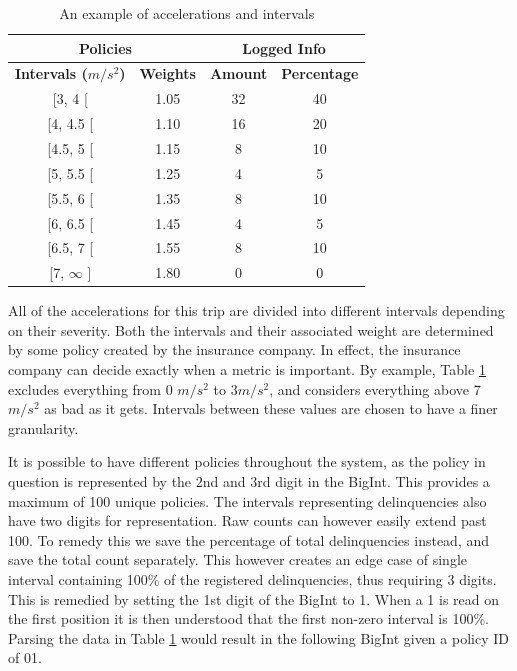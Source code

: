 \begin{table}[h]
\centering
\begin{tabular}{cc | cc}
\multicolumn{2}{c}{\textbf{Policies}} & \multicolumn{2}{c}{\textbf{Logged Info}} \\\hline
\textbf{Intervals ($m/s^{2}$)}     & \textbf{Weights}     & \textbf{Amount}     & \textbf{Percentage}     \\\hline
{[}3, 4 {[}              & 1.05              &   32            & 40              \\
{[}4, 4.5 {[}            & 1.10              &   16            & 20              \\
{[}4.5, 5 {[}            & 1.15              &   8             & 10              \\
{[}5, 5.5 {[}            & 1.25              &   4             & 5              \\
{[}5.5, 6 {[}            & 1.35              &   8             & 10              \\
{[}6, 6.5 {[}            & 1.45              &   4             & 5              \\
{[}6.5, 7 {[}            & 1.55              &   8             & 10              \\
{[}7, $\infty$ {]}       & 1.80              &   0             & 0              \\\hline
\end{tabular}
\caption{An example of accelerations and intervals}
\label{tab:intervalexample}
\end{table}

All of the accelerations for this trip are divided into different intervals depending on their severity. Both the intervals and their associated weight are determined by some policy created by the insurance company. In effect, the insurance company can decide exactly when a metric is important. By example, Table \ref{tab:intervalexample} excludes everything from 0 $m/s^2$ to 3$m/s^2$, and considers everything above 7 $m/s^2$ as bad as it gets. Intervals between these values are chosen to have a finer granularity.

It is possible to have different policies throughout the system, as the policy in question is represented by the 2nd and 3rd digit in the BigInt. This provides a maximum of 100 unique policies. The intervals representing delinquencies also have two digits for representation. Raw counts can however easily extend past 100. To remedy this we save the percentage of total delinquencies instead, and save the total count separately. This however creates an edge case of single interval containing 100\% of the registered delinquencies, thus requiring 3 digits. This is remedied by setting the 1st digit of the BigInt to 1. When a 1 is read on the first position it is then understood that the first non-zero interval is 100\%. Parsing the data in Table \ref{tab:intervalexample} would result in the following BigInt given a policy ID of 01.

